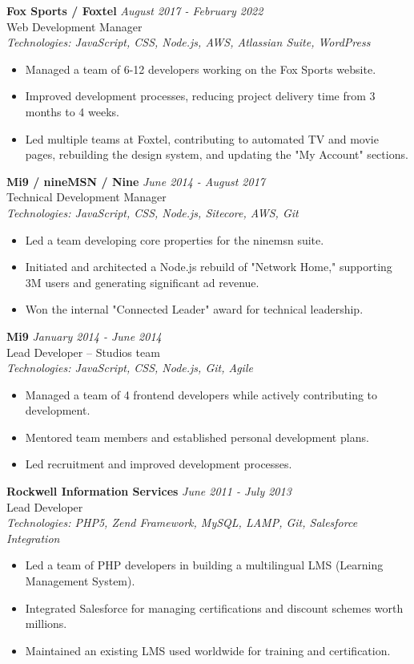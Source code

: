 \documentclass[a4paper,10pt]{article}
\begin{document}
\textbf{Fox Sports / Foxtel} \hfill \textit{August 2017 - February 2022} \\
Web Development Manager \\
\textit{Technologies: JavaScript, CSS, Node.js, AWS, Atlassian Suite, WordPress}
\begin{itemize}
    \item Managed a team of 6-12 developers working on the Fox Sports website.
    \item Improved development processes, reducing project delivery time from 3 months to 4 weeks.
    \item Led multiple teams at Foxtel, contributing to automated TV and movie pages, rebuilding the design system, and updating the "My Account" sections.
\end{itemize}

\textbf{Mi9 / nineMSN / Nine} \hfill \textit{June 2014 - August 2017} \\
Technical Development Manager \\
\textit{Technologies: JavaScript, CSS, Node.js, Sitecore, AWS, Git}
\begin{itemize}
    \item Led a team developing core properties for the ninemsn suite.
    \item Initiated and architected a Node.js rebuild of "Network Home," supporting 3M users and generating significant ad revenue.
    \item Won the internal "Connected Leader" award for technical leadership.
\end{itemize}

\textbf{Mi9} \hfill \textit{January 2014 - June 2014} \\
Lead Developer – Studios team \\
\textit{Technologies: JavaScript, CSS, Node.js, Git, Agile}
\begin{itemize}
    \item Managed a team of 4 frontend developers while actively contributing to development.
    \item Mentored team members and established personal development plans.
    \item Led recruitment and improved development processes.
\end{itemize}

\textbf{Rockwell Information Services} \hfill \textit{June 2011 - July 2013} \\
Lead Developer \\
\textit{Technologies: PHP5, Zend Framework, MySQL, LAMP, Git, Salesforce Integration}
\begin{itemize}
    \item Led a team of PHP developers in building a multilingual LMS (Learning Management System).
    \item Integrated Salesforce for managing certifications and discount schemes worth millions.
    \item Maintained an existing LMS used worldwide for training and certification.
\end{itemize}
\end{document}
